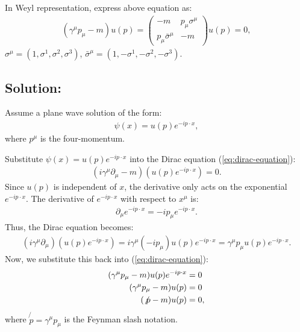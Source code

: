 \begin{enumerate}
    In Weyl representation, express above equation as:
    \begin{align}
    (\gamma^\mu p_\mu - m)u(p) =
    \begin{pmatrix}
    -m & p_\mu \sigma^\mu \\
    p_\mu \bar{\sigma}^\mu & -m
    \end{pmatrix}
    u(p) = 0,
    \end{align}
    $\sigma^\mu = (1, \sigma^1, \sigma^2, \sigma^3)$, $\bar{\sigma}^\mu = (1, -\sigma^1, -\sigma^2, -\sigma^3)$.
    \bigskip\bigskip\hline\hline\bigskip
    \subsection*{Solution:} Assume a plane wave solution of the form:
    \begin{align}
        \psi(x) = u(p)e^{-ip \cdot x},\label{eq:assumed-solution}
    \end{align}
    where $p^\mu$ is the four-momentum.
    
    Substitute $\psi(x) = u(p)e^{-ip \cdot x}$ into the Dirac equation (\ref{eq:dirac-equation}):
    \begin{align*}
        (i\gamma^\mu \partial_\mu - m)(u(p)e^{-ip \cdot x}) = 0.
    \end{align*}
    Since $u(p)$ is independent of $x$, the derivative only acts on the exponential $e^{-ip \cdot x}$. The derivative of $e^{-ip \cdot x}$ with respect to $x^\mu$ is:
    \begin{align*}
        \partial_\mu e^{-ip \cdot x} = -ip_\mu e^{-ip \cdot x}.
    \end{align*}
    Thus, the Dirac equation becomes:
    \begin{align*}
        (i\gamma^\mu \partial_\mu)(u(p)e^{-ip \cdot x}) = i\gamma^\mu (-ip_\mu) u(p) e^{-ip \cdot x} = \gamma^\mu p_\mu u(p) e^{-ip \cdot x}.
    \end{align*}
    Now, we substitute this back into (\ref{eq:dirac-equation}):
    \begin{align*}
        (\gamma^\mu p_\mu - m) u(p) e^{-ip \cdot x} &= 0\notag\\
        (\gamma^\mu p_\mu - m) u(p) &= 0\notag\\
        (\not{p} - m)u(p) &= 0,
    \end{align*}
    where $\not{p} = \gamma^\mu p_\mu$ is the Feynman slash notation.
    

\end{enumerate}
